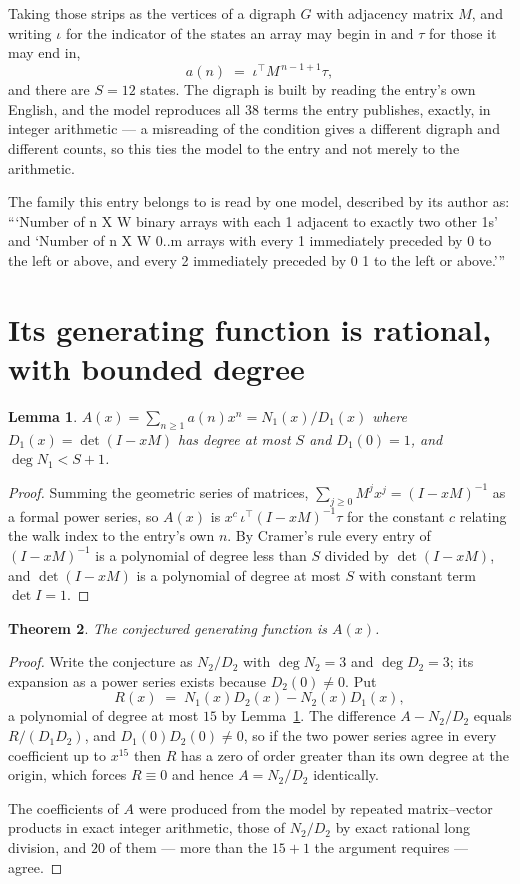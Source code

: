 \documentclass[11pt,a4paper]{article}
\theoremstyle{plain}
\newtheorem{theorem}{Theorem}
\newtheorem{lemma}[theorem]{Lemma}
\theoremstyle{definition}
\begin{document}
Taking those strips as the vertices of a digraph $G$ with adjacency matrix $M$, and writing
$\iota$ for the indicator of the states an array may begin in and $\tau$ for those it may end
in,
\[
a(n)\;=\;\iota^{\!\top}M^{\,n-1+1}\tau ,
\]
and there are $S=12$ states. The digraph is built by reading the entry's own English, and the
model reproduces all $38$ terms the entry publishes, exactly, in integer arithmetic --- a
misreading of the condition gives a different digraph and different counts, so this ties the
model to the entry and not merely to the arithmetic.

The family this entry belongs to is read by one model, described by its author as: ```Number of n X W binary arrays with each 1 adjacent to exactly two other 1s' and `Number of n X W 0..m arrays with every 1 immediately preceded by 0 to the left or above, and every 2 immediately preceded by 0 1 to the left or above.'''


\section{Its generating function is rational, with bounded degree}

\begin{lemma}\label{lem:rat}
$A(x)=\sum_{n\ge1}a(n)x^n=N_1(x)/D_1(x)$ where $D_1(x)=\det(I-xM)$ has degree at most
$S$ and $D_1(0)=1$, and $\deg N_1<S+1$.
\end{lemma}

\begin{proof}
Summing the geometric series of matrices, $\sum_{j\ge0}M^jx^j=(I-xM)^{-1}$ as a formal
power series, so $A(x)$ is $x^{c}\,\iota^{\!\top}(I-xM)^{-1}\tau$ for the constant $c$
relating the walk index to the entry's own $n$. By Cramer's rule every entry of
$(I-xM)^{-1}$ is a polynomial of degree less than $S$ divided by $\det(I-xM)$, and
$\det(I-xM)$ is a polynomial of degree at most $S$ with constant term $\det I=1$.
\end{proof}

\begin{theorem}
The conjectured generating function is $A(x)$.
\end{theorem}

\begin{proof}
Write the conjecture as $N_2/D_2$ with $\deg N_2=3$ and $\deg D_2=3$; its expansion as a
power series exists because $D_2(0)\neq0$. Put
\[
R(x)\;=\;N_1(x)D_2(x)-N_2(x)D_1(x),
\]
a polynomial of degree at most $15$ by Lemma~\ref{lem:rat}. The difference
$A-N_2/D_2$ equals $R/(D_1D_2)$, and $D_1(0)D_2(0)\neq0$, so if the two power series agree in
every coefficient up to $x^{15}$ then $R$ has a zero of order greater than its own
degree at the origin, which forces $R\equiv0$ and hence $A=N_2/D_2$ identically.

The coefficients of $A$ were produced from the model by repeated matrix--vector products in
exact integer arithmetic, those of $N_2/D_2$ by exact rational long division, and $20$
of them --- more than the $15+1$ the argument requires --- agree.
\end{proof}
\end{document}
